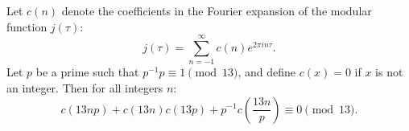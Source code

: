 Let $c(n)$ denote the coefficients in the Fourier expansion of the modular function $j(\tau)$:
$$j(\tau) = \sum_{n=-1}^{\infty} c(n) e^{2\pi i n \tau}.$$
Let $p$ be a prime such that $p^{-1} p \equiv 1 \pmod{13}$, and define $c(x) = 0$ if $x$ is not an integer. Then for all integers $n$:
$$c(13np) + c(13n)c(13p) + p^{-1}c\left(\frac{13n}{p}\right) \equiv 0 \pmod{13}.$$
